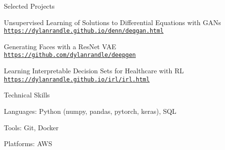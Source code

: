 \documentclass{resume} %
\begin{document}
\begin{rSection}{Selected Projects}

\item Unsupervised Learning of Solutions to Differential Equations with GANs
\newline \href{https://dylanrandle.github.io/denn/deqgan.html}{\texttt{https://dylanrandle.github.io/denn/deqgan.html}}

\item Generating Faces with a ResNet VAE
\newline \href{https://github.com/dylanrandle/deepgen}{\texttt{https://github.com/dylanrandle/deepgen}} 

\item Learning Interpretable Decision Sets for Healthcare with RL
\newline \href{https://dylanrandle.github.io/irl/irl.html}{\texttt{https://dylanrandle.github.io/irl/irl.html}}

\end{rSection}


\begin{rSection}{Technical Skills}

\item Languages: Python (numpy, pandas, pytorch, keras), SQL
\item Tools: Git, Docker
\item Platforms: AWS

\end{rSection}
\end{document}
